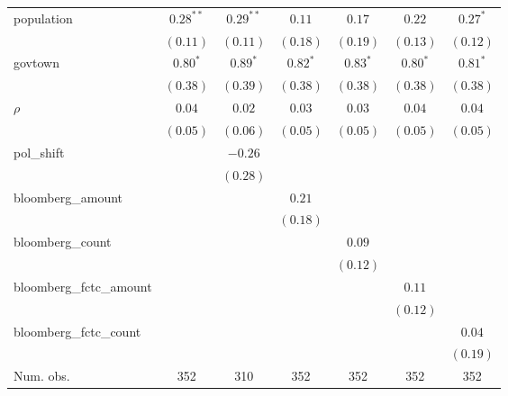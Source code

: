 \begin{table}[!h]
\begin{center}
\begin{tabular}{l c c c c c c }
population              & $0.28^{**}$  & $0.29^{**}$  & $0.11$       & $0.17$       & $0.22$       & $0.27^{*}$   \\
                        & $(0.11)$     & $(0.11)$     & $(0.18)$     & $(0.19)$     & $(0.13)$     & $(0.12)$     \\
govtown                 & $0.80^{*}$   & $0.89^{*}$   & $0.82^{*}$   & $0.83^{*}$   & $0.80^{*}$   & $0.81^{*}$   \\
                        & $(0.38)$     & $(0.39)$     & $(0.38)$     & $(0.38)$     & $(0.38)$     & $(0.38)$     \\
$\rho$                  & $0.04$       & $0.02$       & $0.03$       & $0.03$       & $0.04$       & $0.04$       \\
                        & $(0.05)$     & $(0.06)$     & $(0.05)$     & $(0.05)$     & $(0.05)$     & $(0.05)$     \\
pol\_shift              &              & $-0.26$      &              &              &              &              \\
                        &              & $(0.28)$     &              &              &              &              \\
bloomberg\_amount       &              &              & $0.21$       &              &              &              \\
                        &              &              & $(0.18)$     &              &              &              \\
bloomberg\_count        &              &              &              & $0.09$       &              &              \\
                        &              &              &              & $(0.12)$     &              &              \\
bloomberg\_fctc\_amount &              &              &              &              & $0.11$       &              \\
                        &              &              &              &              & $(0.12)$     &              \\
bloomberg\_fctc\_count  &              &              &              &              &              & $0.04$       \\
                        &              &              &              &              &              & $(0.19)$     \\
\midrule
Num. obs.               & 352          & 310          & 352          & 352          & 352          & 352          \\

\end{tabular}
\end{center}
\end{table}
